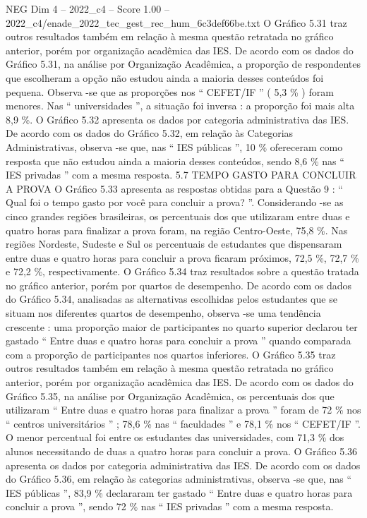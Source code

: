 \begin{textsample}{NEG Dim 4 – 2022\_c4 – Score 1.00 – 2022\_c4/enade\_2022\_tec\_gest\_rec\_hum\_6c3def66be.txt}
O Gráfico 5.31 traz outros resultados também em relação à mesma questão retratada no gráfico anterior, porém por organização acadêmica das IES.
De acordo com os dados do Gráfico 5.31, na análise por Organização Acadêmica, a proporção de respondentes que escolheram a opção não estudou ainda a maioria desses conteúdos foi pequena.
Observa -se que as proporções nos “ CEFET/IF ” ( 5,3 \% ) foram menores.
Nas “ universidades ”, a situação foi inversa : a proporção foi mais alta 8,9 \%.
O Gráfico 5.32 apresenta os dados por categoria administrativa das IES.
De acordo com os dados do Gráfico 5.32, em relação às Categorias Administrativas, observa -se que, nas “ IES públicas ”, 10 \% ofereceram como resposta que não estudou ainda a maioria desses conteúdos, sendo 8,6 \% nas “ IES privadas ” com a mesma resposta. 5.7 TEMPO GASTO PARA CONCLUIR A PROVA O Gráfico 5.33 apresenta as respostas obtidas para a Questão 9 : “ Qual foi o tempo gasto por você para concluir a prova? ”.
Considerando -se as cinco grandes regiões brasileiras, os percentuais dos que utilizaram entre duas e quatro horas para finalizar a prova foram, na região Centro-Oeste, 75,8 \%.
Nas regiões Nordeste, Sudeste e Sul os percentuais de estudantes que dispensaram entre duas e quatro horas para concluir a prova ficaram próximos, 72,5 \%, 72,7 \% e 72,2 \%, respectivamente.
O Gráfico 5.34 traz resultados sobre a questão tratada no gráfico anterior, porém por quartos de desempenho.
De acordo com os dados do Gráfico 5.34, analisadas as alternativas escolhidas pelos estudantes que se situam nos diferentes quartos de desempenho, observa -se uma tendência crescente : uma proporção maior de participantes no quarto superior declarou ter gastado “ Entre duas e quatro horas para concluir a prova ” quando comparada com a proporção de participantes nos quartos inferiores.
O Gráfico 5.35 traz outros resultados também em relação à mesma questão retratada no gráfico anterior, porém por organização acadêmica das IES.
De acordo com os dados do Gráfico 5.35, na análise por Organização Acadêmica, os percentuais dos que utilizaram “ Entre duas e quatro horas para finalizar a prova ” foram de 72 \% nos “ centros universitários ” ; 78,6 \% nas “ faculdades ” e 78,1 \% nos “ CEFET/IF ”.
O menor percentual foi entre os estudantes das universidades, com 71,3 \% dos alunos necessitando de duas a quatro horas para concluir a prova.
O Gráfico 5.36 apresenta os dados por categoria administrativa das IES.
De acordo com os dados do Gráfico 5.36, em relação às categorias administrativas, observa -se que, nas “ IES públicas ”, 83,9 \% declararam ter gastado “ Entre duas e quatro horas para concluir a prova ”, sendo 72 \% nas “ IES privadas ” com a mesma resposta.

\end{textsample}
